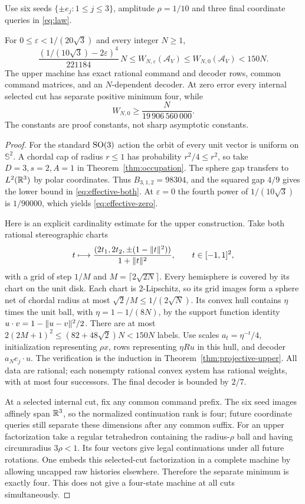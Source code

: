 Use six seeds $\{\pm e_j:1\le j\le3\}$, amplitude $\rho=1/10$ and
three final coordinate queries in \eqref{eq:law}.
\begin{theorem}
\label{thm:effective}
For $0\le\varepsilon<1/(20\sqrt3)$ and every integer $N\ge1$,
\begin{equation}\label{eq:effective-both}
 \frac{(1/(10\sqrt3)-2\varepsilon)^4}{221184}\,N
          \le W_{N,\varepsilon}(\mathcal A_V)
          \le W_{N,0}(\mathcal A_V)<150N.
\end{equation}
The upper machine has exact rational command and decoder rows, common
command matrices, and an $N$-dependent decoder. At zero error every
internal selected cut has separate positive minimum four, while
\begin{equation}\label{eq:effective-zero}
 W_{N,0}\ge\frac{N}{19\,906\,560\,000}.
\end{equation}
The constants are proof constants, not sharp asymptotic constants.
\end{theorem}
\begin{proof}
For the standard $\operatorname{SO}(3)$ action the orbit of every unit vector is
uniform on $\mathbb S^2$. A chordal cap of radius $r\le1$ has probability
$r^2/4\le r^2$, so take $D=3,s=2,A=1$ in
Theorem~\ref{thm:occupation}. The sphere gap transfers to $L^2(\mathbb R^3)$
by polar coordinates. Thus $B_{3,1,2}=98304$, and the squared gap
$4/9$ gives the lower bound in \eqref{eq:effective-both}.
At $\varepsilon=0$ the fourth power of $1/(10\sqrt3)$ is $1/90000$,
which yields \eqref{eq:effective-zero}.

Here is an explicit cardinality estimate for the upper construction.
Take both rational stereographic charts
\[
 t\longmapsto\frac{(2t_1,2t_2,\pm(1-\lVert t\rVert^2))}{1+\lVert t\rVert^2},
 \qquad t\in[-1,1]^2,
\]
with a grid of step $1/M$ and $M=\lceil2\sqrt{2N}\rceil$.
Every hemisphere is covered by its chart on the unit disk. Each chart
is $2$-Lipschitz, so its grid images form a sphere net of chordal radius
at most $\sqrt2/M\le1/(2\sqrt N)$. Its convex hull contains
$\eta$ times the unit ball, with $\eta=1-1/(8N)$, by the support
function identity $u\cdot v=1-\lVert u-v\rVert^2/2$.
There are at most $2(2M+1)^2\le(82+48\sqrt2)N<150N$ labels.
Use scales $a_t=\eta^{-t}/4$, initialization representing $\rho x$,
rows representing $\eta Ru$ in this hull, and decoder $a_N e_j\cdot u$.
The verification is the induction in Theorem~\ref{thm:projective-upper}.
All data are rational; each nonempty rational convex system has rational
weights, with at most four successors. The final decoder is bounded by
$2/7$.

At a selected internal cut, fix any common command prefix. The six seed
images affinely span $\mathbb R^3$, so the normalized continuation rank is
four; future coordinate queries still separate these dimensions after
any common suffix. For an upper factorization take a regular tetrahedron
containing the radius-$\rho$ ball and having circumradius $3\rho<1$.
Its four vectors give legal continuations under all future rotations.
One embeds this selected-cut factorization in a complete machine by
allowing uncapped raw histories elsewhere. Therefore the separate
minimum is exactly four. This does not give a four-state machine at
all cuts simultaneously.
\end{proof}
